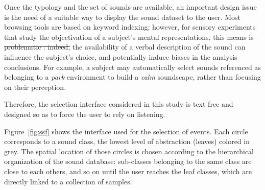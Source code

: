 \documentclass[12pt]{elsarticle}
\providecommand{\DIFadd}[1]{{\protect\color{blue}\uwave{#1}}} %
\providecommand{\DIFdel}[1]{{\protect\color{red}\sout{#1}}}                      %
\providecommand{\DIFaddbegin}{} %
\providecommand{\DIFaddend}{} %
\providecommand{\DIFdelbegin}{} %
\providecommand{\DIFdelend}{} %
\begin{document}
Once the typology and the set of sounds are available, an important design issue is the need of a suitable way to display the sound dataset to the user. Most browsing tools are based on keyword indexing; however, for sensory experiments that study the objectivation of a subject's mental representations, this \DIFdelbegin \DIFdel{means is problematic : indeed, }\DIFdelend \DIFaddbegin \DIFadd{may be problematic as }\DIFaddend the availability of a verbal description of the sound can influence the subject's choice, and potentially induce biases in the analysis conclusions. For example, a subject may automatically select sounds referenced as belonging to a \emph{park} environment to build a \emph{calm} soundscape, rather than focusing on their perception.


Therefore, the selection interface considered in this study is text free and designed so as to force the user to rely on listening.


Figure~\ref{fig:ssf} shows the interface used for the selection of events. Each circle corresponds to a sound class, the lowest level of abstraction (leaves) colored in grey. The spatial location of those circles is chosen according to the hierarchical organization of the sound database: sub-classes belonging to the same class are close to each others, and so on until the user reaches the leaf classes, which are directly linked to a collection of samples.

\end{document}
